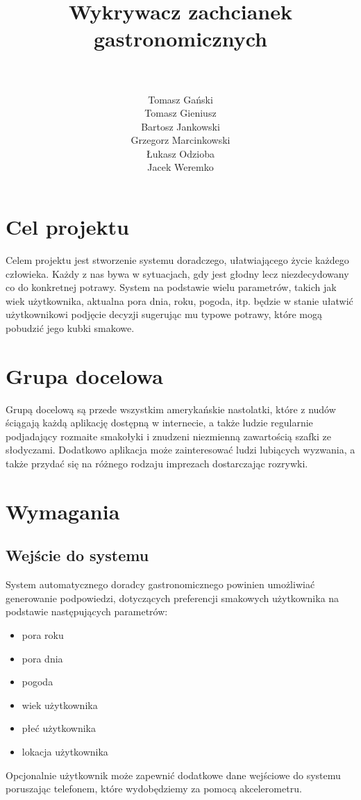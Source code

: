 \documentclass[a4paper,twoside,11pt]{article}
\author{\\ ~ \\ Tomasz Gański \\
Tomasz Gieniusz \\
Bartosz Jankowski\\
Grzegorz Marcinkowski\\
Łukasz Odzioba\\
Jacek Weremko}
\title{\LARGE Wykrywacz zachcianek gastronomicznych}
\begin{document}


\tableofcontents

\newpage

\section{Cel projektu}
Celem projektu jest stworzenie systemu doradczego, ułatwiającego życie każdego człowieka. Każdy z nas bywa w sytuacjach, gdy jest głodny lecz niezdecydowany co do konkretnej potrawy. 
System na podstawie wielu parametrów, takich jak wiek użytkownika, aktualna pora dnia, roku, pogoda, itp. będzie w stanie ułatwić użytkownikowi podjęcie decyzji sugerując mu typowe potrawy, które mogą pobudzić jego kubki smakowe.

\section{Grupa docelowa}
Grupą docelową są przede wszystkim amerykańskie nastolatki, które z nudów ściągają każdą aplikację dostępną w internecie, a także ludzie regularnie podjadający rozmaite smakołyki i znudzeni niezmienną zawartością szafki ze słodyczami. Dodatkowo aplikacja może zainteresować ludzi lubiących wyzwania, a także przydać się na różnego rodzaju imprezach dostarczając rozrywki.

\section{Wymagania}
\subsection{Wejście do systemu}
System automatycznego doradcy gastronomicznego powinien umożliwiać generowanie podpowiedzi, dotyczących preferencji smakowych użytkownika na podstawie następujących parametrów:
\begin{itemize}
\item pora roku
\item pora dnia
\item pogoda
\item wiek użytkownika
\item płeć użytkownika
\item lokacja użytkownika
\end{itemize}

Opcjonalnie użytkownik może zapewnić dodatkowe dane wejściowe do systemu poruszając telefonem, które wydobędziemy za pomocą akcelerometru. 
\end{document}
